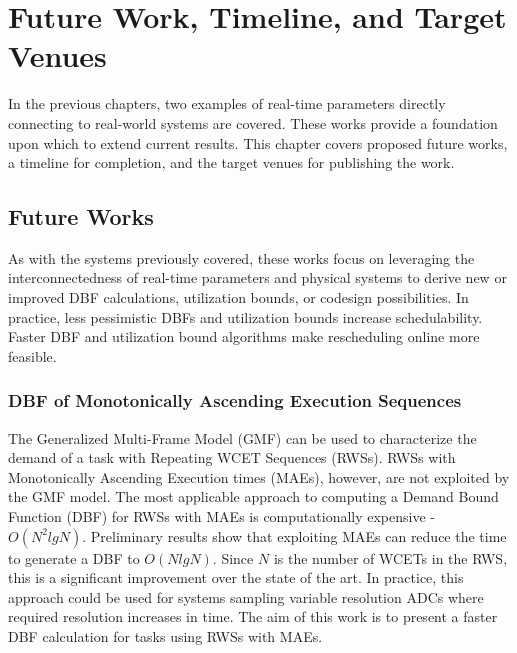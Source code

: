 \section{Future Work, Timeline, and Target Venues} \label{chap:futureWork}

In the previous chapters, two examples of real-time parameters directly connecting to real-world systems are covered.
These works provide a foundation upon which to extend current results.
This chapter covers proposed future works, a timeline for completion, and the target venues for publishing the work.

\subsection{Future Works}

As with the systems previously covered, these works focus on leveraging the interconnectedness of real-time parameters and physical systems to derive new or improved DBF calculations, utilization bounds, or codesign possibilities.
In practice, less pessimistic DBFs and utilization bounds increase schedulability.
Faster DBF and utilization bound algorithms make rescheduling online more feasible.

\subsubsection{DBF of Monotonically Ascending Execution Sequences}

The Generalized Multi-Frame Model (GMF) can be used to characterize the demand of a task with Repeating WCET Sequences (RWSs).
RWSs with Monotonically Ascending Execution times (MAEs), however, are not exploited by the GMF model.
The most applicable approach to computing a Demand Bound Function (DBF) for RWSs with MAEs is computationally expensive - $O(N^2 lg N)$.
Preliminary results show that exploiting MAEs can reduce the time to generate a DBF to $O(N lg N)$.
Since $N$ is the number of WCETs in the RWS, this is a significant improvement over the state of the art.
In practice, this approach could be used for systems sampling variable resolution ADCs where required resolution increases in time.
The aim of this work is to present a faster DBF calculation for tasks using RWSs with MAEs.

